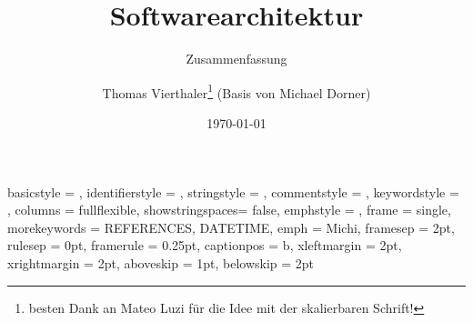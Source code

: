 \documentclass[a4paper,fontsize=9pt, DIV=calc]{scrartcl}
\title{Softwarearchitektur}
\subtitle{Zusammenfassung}
\author{Thomas Vierthaler\footnote{besten Dank an Mateo Luzi für die Idee mit der skalierbaren Schrift!} (Basis von Michael Dorner)}
\date{\today}
\begin{document}
 {
	basicstyle		= \ttfamily\small,
	identifierstyle	= \ttfamily\normalsize,
	stringstyle		= \ttfamily\small\color{siemensred},
	commentstyle	= \ttfamily\small\color{siemensgreen},
	keywordstyle	= \ttfamily\small\color{siemensblue},
	columns			= fullflexible,
	showstringspaces= false,
	emphstyle 		= \color{siemensorange},
	frame			= single,
	morekeywords	= {REFERENCES, DATETIME},
	emph			= {Michi},
	framesep 		= 2pt,
	rulesep			= 0pt,
	framerule		= 0.25pt,
	captionpos		= b,
	xleftmargin 	= 2pt,
	xrightmargin	= 2pt,
	aboveskip		= 1pt,
	belowskip		= 2pt
 }



\setlength{\parindent}{0pt} 

\renewcommand{\arraystretch}{0.9}


\maketitle
\tableofcontents
\clearpage
{}
\end{document}
